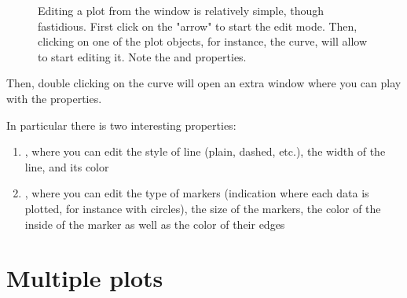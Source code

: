 	\begin{figure}[h!]
		\center
		\caption{
			Editing a plot from the window is relatively simple, though fastidious.
			First click on the "arrow" to start the edit mode. 
			Then, clicking on one of the plot objects, for instance, the curve, will allow to start editing it. 
			Note the  and  properties.
			}
		\label{fig-edit}
		\end{figure}	
	Then, double clicking on the curve will open an extra window where you can play with the properties.

	In particular there is two interesting properties:
	\begin{enumerate}
		\item {}, where you can edit the style of line (plain, dashed, etc.), the width of the line, and its color
		\item {}, where you can edit the type of markers (indication where each data is plotted, for instance with circles), the size of the markers, the color of the inside of the marker as well as the color of their edges
	\end{enumerate}

\section{Multiple plots}
